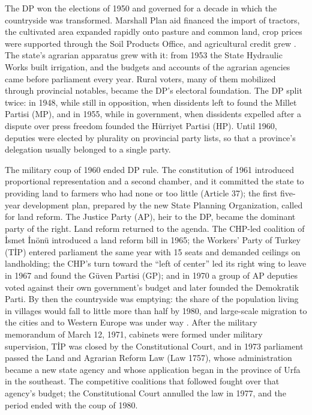 \documentclass[12pt]{article}
\begin{document}
The DP won the elections of 1950 and governed for a decade in which the countryside was transformed. Marshall Plan aid financed the import of tractors, the cultivated area expanded rapidly onto pasture and common land, crop prices were supported through the Soil Products Office, and agricultural credit grew \citep{keyder1987,ahmad1977,pamuk2018}. The state's agrarian apparatus grew with it: from 1953 the State Hydraulic Works built irrigation, and the budgets and accounts of the agrarian agencies came before parliament every year. Rural voters, many of them mobilized through provincial notables, became the DP's electoral foundation. The DP split twice: in 1948, while still in opposition, when dissidents left to found the Millet Partisi (MP), and in 1955, while in government, when dissidents expelled after a dispute over press freedom founded the Hürriyet Partisi (HP). Until 1960, deputies were elected by plurality on provincial party lists, so that a province's delegation usually belonged to a single party.

The military coup of 1960 ended DP rule. The constitution of 1961 introduced proportional representation and a second chamber, and it committed the state to providing land to farmers who had none or too little (Article 37); the first five-year development plan, prepared by the new State Planning Organization, called for land reform. The Justice Party (AP), heir to the DP, became the dominant party of the right. Land reform returned to the agenda. The CHP-led coalition of İsmet İnönü introduced a land reform bill in 1965; the Workers' Party of Turkey (TİP) entered parliament the same year with 15 seats and demanded ceilings on landholding; the CHP's turn toward the ``left of center'' led its right wing to leave in 1967 and found the Güven Partisi (GP); and in 1970 a group of AP deputies voted against their own government's budget and later founded the Demokratik Parti. By then the countryside was emptying: the share of the population living in villages would fall to little more than half by 1980, and large-scale migration to the cities and to Western Europe was under way \citep{pamuk2018}. After the military memorandum of March 12, 1971, cabinets were formed under military supervision, TİP was closed by the Constitutional Court, and in 1973 parliament passed the Land and Agrarian Reform Law (Law 1757), whose administration became a new state agency and whose application began in the province of Urfa in the southeast. The competitive coalitions that followed fought over that agency's budget; the Constitutional Court annulled the law in 1977, and the period ended with the coup of 1980.
\end{document}
